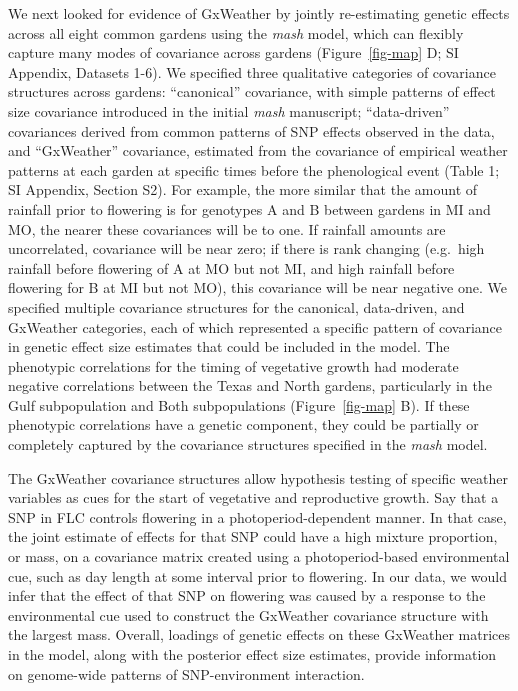 \documentclass[
  9pt,
  twocolumn,
  twoside]{pnas-new}
\begin{document}
We next looked for evidence of GxWeather by jointly re-estimating
genetic effects across all eight common gardens using the \emph{mash}
model, which can flexibly capture many modes of covariance across
gardens (Figure~\ref{fig-map} D; SI Appendix, Datasets 1-6). We
specified three qualitative categories of covariance structures across
gardens: ``canonical'' covariance, with simple patterns of effect size
covariance introduced in the initial \emph{mash} manuscript;
``data-driven'' covariances derived from common patterns of SNP effects
observed in the data, and ``GxWeather'' covariance, estimated from the
covariance of empirical weather patterns at each garden at specific
times before the phenological event (Table 1; SI Appendix, Section S2).
For example, the more similar that the amount of rainfall prior to
flowering is for genotypes A and B between gardens in MI and MO, the
nearer these covariances will be to one. If rainfall amounts are
uncorrelated, covariance will be near zero; if there is rank changing
(e.g.~high rainfall before flowering of A at MO but not MI, and high
rainfall before flowering for B at MI but not MO), this covariance will
be near negative one. We specified multiple covariance structures for
the canonical, data-driven, and GxWeather categories, each of which
represented a specific pattern of covariance in genetic effect size
estimates that could be included in the model. The phenotypic
correlations for the timing of vegetative growth had moderate negative
correlations between the Texas and North gardens, particularly in the
Gulf subpopulation and Both subpopulations (Figure~\ref{fig-map} B). If
these phenotypic correlations have a genetic component, they could be
partially or completely captured by the covariance structures specified
in the \emph{mash} model.

The GxWeather covariance structures allow hypothesis testing of specific
weather variables as cues for the start of vegetative and reproductive
growth. Say that a SNP in FLC controls flowering in a
photoperiod-dependent manner. In that case, the joint estimate of
effects for that SNP could have a high mixture proportion, or mass, on a
covariance matrix created using a photoperiod-based environmental cue,
such as day length at some interval prior to flowering. In our data, we
would infer that the effect of that SNP on flowering was caused by a
response to the environmental cue used to construct the GxWeather
covariance structure with the largest mass. Overall, loadings of genetic
effects on these GxWeather matrices in the model, along with the
posterior effect size estimates, provide information on genome-wide
patterns of SNP-environment interaction.
\end{document}
